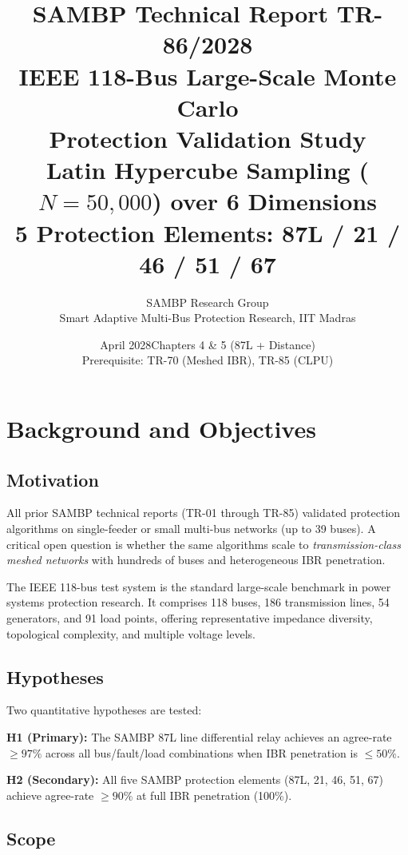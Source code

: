 \documentclass[11pt,a4paper]{article}
\title{%
  \textbf{\textsf{\color{sambpblue}SAMBP Technical Report TR-86/2028}}\\[6pt]
  \Large IEEE 118-Bus Large-Scale Monte Carlo\\
  Protection Validation Study\\[4pt]
  \normalsize Latin Hypercube Sampling ($N = 50{,}000$) over 6 Dimensions\\
  5 Protection Elements: 87L / 21 / 46 / 51 / 67}
\author{SAMBP Research Group\\[2pt]
  \small Smart Adaptive Multi-Bus Protection Research, IIT Madras}
\date{April 2028\quad\textbar\quad Chapters 4 \& 5 (87L + Distance)\\
  Prerequisite: TR-70 (Meshed IBR), TR-85 (CLPU)}
\begin{document}
\maketitle
\tableofcontents
\clearpage

\section{Background and Objectives}
\label{sec:background}

\subsection{Motivation}

All prior SAMBP technical reports (TR-01 through TR-85) validated protection
algorithms on single-feeder or small multi-bus networks (up to 39 buses).
A critical open question is whether the same algorithms scale to
\emph{transmission-class meshed networks} with hundreds of buses and
heterogeneous IBR penetration.

The IEEE 118-bus test system \cite{Christie1993} is the standard large-scale
benchmark in power systems protection research.  It comprises 118 buses,
186 transmission lines, 54 generators, and 91 load points, offering
representative impedance diversity, topological complexity, and multiple
voltage levels.

\subsection{Hypotheses}

Two quantitative hypotheses are tested:

\begin{mdframed}[style=finding]
\textbf{H1 (Primary):} The SAMBP 87L line differential relay achieves an
agree-rate $\geq 97\%$ across all bus/fault/load combinations when IBR
penetration is $\leq 50\%$.
\end{mdframed}

\begin{mdframed}[style=finding]
\textbf{H2 (Secondary):} All five SAMBP protection elements (87L, 21, 46,
51, 67) achieve agree-rate $\geq 90\%$ at full IBR penetration (100\%).
\end{mdframed}

\subsection{Scope}
\end{document}
